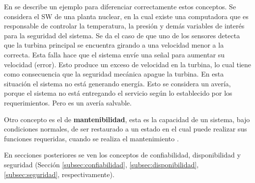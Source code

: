 En \cite{FTDesign} se describe un ejemplo para diferenciar correctamente estos conceptos. Se considera
el \ac{SW} de una planta nuclear, en la cual existe una computadora que es responsable de controlar
la temperatura, la presión y demás variables de interés para la seguridad del sistema. Se da el
caso de que uno de los sensores detecta que la turbina principal se encuentra girando a una
velocidad menor a la correcta. Esta falla hace que el sistema envíe una señal para aumentar su
velocidad (error). Esto produce un exceso de velocidad en la turbina, lo cual tiene como
consecuencia que la seguridad mecánica apague la turbina. En esta situación el sistema no está
generando energía. Esto se considera un avería, porque el sistema no está entregando el servicio
según lo establecido por los requerimientos. Pero es un avería salvable.

Otro concepto es el de \textbf{mantenibilidad}, esta es la capacidad de un sistema, bajo condiciones normales, de ser restaurado a un estado en el cual puede realizar sus funciones requeridas, cuando se realiza el mantenimiento \citep{Rausand04}.

En secciones posteriores se ven los conceptos de confiabilidad, disponibilidad y seguridad (Sección \ref{subsec:confiabilidad}, \ref{subsec:disponibilidad}, \ref{subsec:seguridad}, respectivamente).
